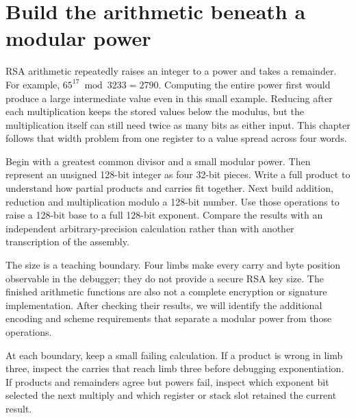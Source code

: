 \section{Build the arithmetic beneath a modular power}
RSA arithmetic repeatedly raises an integer to a power and takes a remainder. For
example, \(65^{17}\bmod3233=2790\). Computing the entire power first would produce a
large intermediate value even in this small example. Reducing after each multiplication
keeps the stored values below the modulus, but the multiplication itself can still
need twice as many bits as either input. This chapter follows that width problem from
one register to a value spread across four words.

Begin with a greatest common divisor and a small modular power. Then represent an
unsigned 128-bit integer as four 32-bit pieces. Write a full product to understand
how partial products and carries fit together. Next build addition, reduction and
multiplication modulo a 128-bit number. Use those operations to raise a 128-bit base
to a full 128-bit exponent. Compare the results with an independent arbitrary-precision
calculation rather than with another transcription of the assembly.

The size is a teaching boundary. Four limbs make every carry and byte position
observable in the debugger; they do not provide a secure RSA key size. The finished
arithmetic functions are also not a complete encryption or signature implementation.
After checking their results, we will identify the additional encoding and scheme
requirements that separate a modular power from those operations.

At each boundary, keep a small failing calculation. If a product is wrong in limb
three, inspect the carries that reach limb three before debugging exponentiation.
If products and remainders agree but powers fail, inspect which exponent bit selected
the next multiply and which register or stack slot retained the current result.
